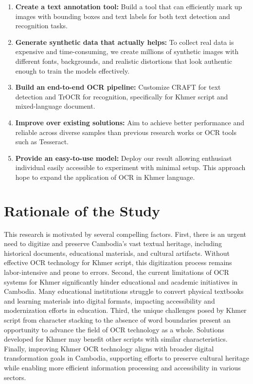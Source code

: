 \begin{enumerate}
    \item \textbf{Create a text annotation tool:} Build a tool that can efficiently mark up images with bounding boxes and text labels for both text detection and recognition tasks.

    \item \textbf{Generate synthetic data that actually helps:} To collect real data is expensive and time-consuming, we create millions of synthetic images with different fonts, backgrounds, and realistic distortions that look authentic enough to train the models effectively.

    \item \textbf{Build an end-to-end OCR pipeline:} Customize CRAFT for text detection and TrOCR for recognition, specifically for Khmer script and mixed-language document.

    \item \textbf{Improve over existing solutions:} Aim to achieve better performance and reliable across diverse samples than previous research works or OCR tools such as Tesseract.
    
    \item \textbf{Provide an easy-to-use model:} Deploy our result allowing enthusiast individual easily accessible to experiment with minimal setup. This approach hope to expand the application of OCR in Khmer language.
\end{enumerate}


\section{Rationale of the Study}
\label{sec:rationale}
       This research is motivated by several compelling factors. First, there is an urgent need to digitize and preserve Cambodia's vast textual heritage, including historical documents, educational materials, and cultural artifacts. Without effective OCR technology for Khmer script, this digitization process remains labor-intensive and prone to errors.
       Second, the current limitations of OCR systems for Khmer significantly hinder educational and academic initiatives in Cambodia. Many educational institutions struggle to convert physical textbooks and learning materials into digital formats, impacting accessibility and modernization efforts in education.
       Third, the unique challenges posed by Khmer script from character stacking to the absence of word boundaries present an opportunity to advance the field of OCR technology as a whole. Solutions developed for Khmer may benefit other scripts with similar characteristics.
       Finally, improving Khmer OCR technology aligns with broader digital transformation goals in Cambodia, supporting efforts to preserve cultural heritage while enabling more efficient information processing and accessibility in various sectors.


